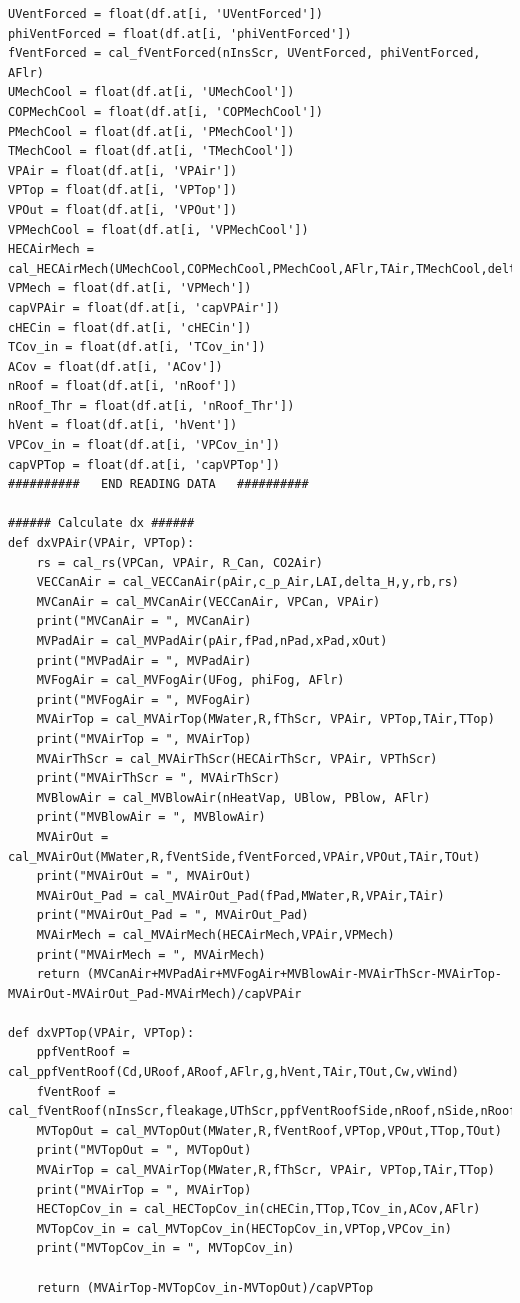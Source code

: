 \documentclass[a4paper]{article}
\begin{document}
\begin{verbatim}
UVentForced = float(df.at[i, 'UVentForced'])
phiVentForced = float(df.at[i, 'phiVentForced'])
fVentForced = cal_fVentForced(nInsScr, UVentForced, phiVentForced, AFlr)
UMechCool = float(df.at[i, 'UMechCool'])
COPMechCool = float(df.at[i, 'COPMechCool'])
PMechCool = float(df.at[i, 'PMechCool'])
TMechCool = float(df.at[i, 'TMechCool'])
VPAir = float(df.at[i, 'VPAir'])
VPTop = float(df.at[i, 'VPTop'])
VPOut = float(df.at[i, 'VPOut'])
VPMechCool = float(df.at[i, 'VPMechCool'])
HECAirMech = cal_HECAirMech(UMechCool,COPMechCool,PMechCool,AFlr,TAir,TMechCool,delta_H,VPAir,VPMechCool)
VPMech = float(df.at[i, 'VPMech'])
capVPAir = float(df.at[i, 'capVPAir'])
cHECin = float(df.at[i, 'cHECin'])
TCov_in = float(df.at[i, 'TCov_in'])
ACov = float(df.at[i, 'ACov'])
nRoof = float(df.at[i, 'nRoof'])
nRoof_Thr = float(df.at[i, 'nRoof_Thr'])
hVent = float(df.at[i, 'hVent'])
VPCov_in = float(df.at[i, 'VPCov_in'])
capVPTop = float(df.at[i, 'capVPTop'])
##########   END READING DATA   ##########

###### Calculate dx ######
def dxVPAir(VPAir, VPTop):
    rs = cal_rs(VPCan, VPAir, R_Can, CO2Air)
    VECCanAir = cal_VECCanAir(pAir,c_p_Air,LAI,delta_H,y,rb,rs)
    MVCanAir = cal_MVCanAir(VECCanAir, VPCan, VPAir)
    print("MVCanAir = ", MVCanAir)
    MVPadAir = cal_MVPadAir(pAir,fPad,nPad,xPad,xOut)
    print("MVPadAir = ", MVPadAir)
    MVFogAir = cal_MVFogAir(UFog, phiFog, AFlr)
    print("MVFogAir = ", MVFogAir)
    MVAirTop = cal_MVAirTop(MWater,R,fThScr, VPAir, VPTop,TAir,TTop)
    print("MVAirTop = ", MVAirTop)
    MVAirThScr = cal_MVAirThScr(HECAirThScr, VPAir, VPThScr)
    print("MVAirThScr = ", MVAirThScr)
    MVBlowAir = cal_MVBlowAir(nHeatVap, UBlow, PBlow, AFlr)
    print("MVBlowAir = ", MVBlowAir)
    MVAirOut = cal_MVAirOut(MWater,R,fVentSide,fVentForced,VPAir,VPOut,TAir,TOut)
    print("MVAirOut = ", MVAirOut)
    MVAirOut_Pad = cal_MVAirOut_Pad(fPad,MWater,R,VPAir,TAir)
    print("MVAirOut_Pad = ", MVAirOut_Pad)
    MVAirMech = cal_MVAirMech(HECAirMech,VPAir,VPMech)
    print("MVAirMech = ", MVAirMech)
    return (MVCanAir+MVPadAir+MVFogAir+MVBlowAir-MVAirThScr-MVAirTop-MVAirOut-MVAirOut_Pad-MVAirMech)/capVPAir

def dxVPTop(VPAir, VPTop):
    ppfVentRoof = cal_ppfVentRoof(Cd,URoof,ARoof,AFlr,g,hVent,TAir,TOut,Cw,vWind)
    fVentRoof = cal_fVentRoof(nInsScr,fleakage,UThScr,ppfVentRoofSide,nRoof,nSide,nRoof_Thr,ppfVentRoof)
    MVTopOut = cal_MVTopOut(MWater,R,fVentRoof,VPTop,VPOut,TTop,TOut)
    print("MVTopOut = ", MVTopOut)
    MVAirTop = cal_MVAirTop(MWater,R,fThScr, VPAir, VPTop,TAir,TTop)
    print("MVAirTop = ", MVAirTop)
    HECTopCov_in = cal_HECTopCov_in(cHECin,TTop,TCov_in,ACov,AFlr)
    MVTopCov_in = cal_MVTopCov_in(HECTopCov_in,VPTop,VPCov_in)
    print("MVTopCov_in = ", MVTopCov_in)

    return (MVAirTop-MVTopCov_in-MVTopOut)/capVPTop

\end{verbatim}
\end{document}
